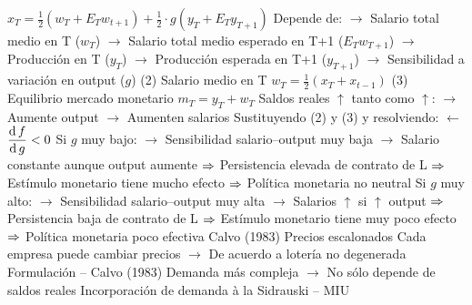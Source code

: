 \documentclass{nuevotema}
\begin{document}
\begin{esquemal}
				\4[] $x_T = \frac{1}{2} \left( w_T + E_T w_{t+1} \right) + \frac{1}{2}\cdot g\left( y_T + E_T y_{T+1} \right)$
				\4[] Depende de:
				\4[] $\to$ Salario total medio en T ($w_T$)
				\4[] $\to$ Salario total medio esperado en T+1 ($E_T w_{T+1}$)
				\4[] $\to$ Producción en T ($y_T$)
				\4[] $\to$ Producción esperada en T+1 ($y_{T+1}$)
				\4[] $\to$ Sensibilidad a variación en output ($g$)
				\4[] (2) Salario medio en T
				\4[] $w_T = \frac{1}{2} \left( x_T + x_{t-1} \right)$
				\4[] (3) Equilibrio mercado monetario
				\4[] $m_T = y_T + w_T$
				\4[] Saldos reales $\uparrow$ tanto como $\uparrow$:
				\4[] $\to$ Aumente output
				\4[] $\to$ Aumenten salarios
				\4[] Sustituyendo (2) y (3) y resolviendo:
				\4[]   $\leftarrow$ $\dfrac{\text{d} \, f}{\text{d} \, g} < 0$
				\4[] Si $g$ muy bajo:
				\4[] $\to$ Sensibilidad salario--output muy baja
				\4[] $\to$ Salario constante aunque output aumente
				\4[] $\Rightarrow$ Persistencia elevada de contrato de L
				\4[] $\Rightarrow$ Estímulo monetario tiene mucho efecto
				\4[] $\Rightarrow$ Política monetaria no neutral
				\4[] Si $g$ muy alto:
				\4[] $\to$ Sensibilidad salario--output muy alta
				\4[] $\to$ Salarios $\uparrow$ si $\uparrow$ output
				\4[] $\Rightarrow$ Persistencia baja de contrato de L
				\4[] $\Rightarrow$ Estímulo monetario tiene muy poco efecto
				\4[] $\Rightarrow$ Política monetaria poco efectiva
				\4 Calvo (1983)
				\4[] Precios escalonados
				\4[] Cada empresa puede cambiar precios
				\4[] $\to$ De acuerdo a lotería no degenerada
				\4 Formulación -- Calvo (1983)
				\4[] Demanda más compleja
				\4[] $\to$ No sólo depende de saldos reales
				\4[] Incorporación de demanda à la Sidrauski -- MIU

\end{esquemal}
\end{document}
